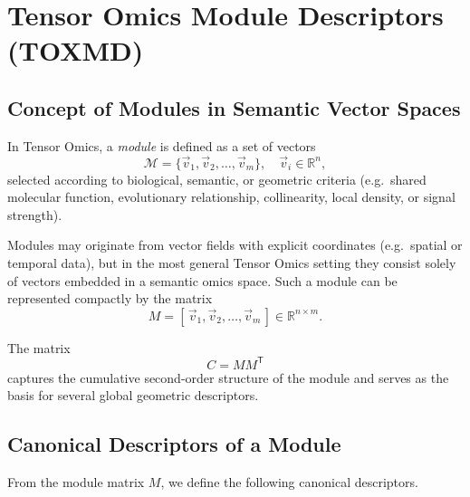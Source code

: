\documentclass{article}
\begin{document}
\section{Tensor Omics Module Descriptors (TOXMD)}
\label{sec:module_descriptors}

\subsection{Concept of Modules in Semantic Vector Spaces}

In Tensor Omics, a \textit{module} is defined as a set of vectors
\[
\mathcal{M} = \{ \vec{v}_1, \vec{v}_2, \ldots, \vec{v}_m \}, \quad
\vec{v}_i \in \mathbb{R}^n,
\]
selected according to biological, semantic, or geometric criteria
(e.g.\ shared molecular function, evolutionary relationship, collinearity,
local density, or signal strength).

Modules may originate from vector fields with explicit coordinates
(e.g.\ spatial or temporal data), but in the most general Tensor Omics setting
they consist solely of vectors embedded in a semantic omics space.
Such a module can be represented compactly by the matrix
\[
M = [\, \vec{v}_1, \vec{v}_2, \ldots, \vec{v}_m \,] \in \mathbb{R}^{n \times m}.
\]

The matrix
\[
C = M M^{\mathsf{T}}
\]
captures the cumulative second-order structure of the module and serves as the
basis for several global geometric descriptors.

\subsection{Canonical Descriptors of a Module}
\label{ssec:canonical_module_descriptors}

From the module matrix \(M\), we define the following canonical descriptors.
\end{document}
